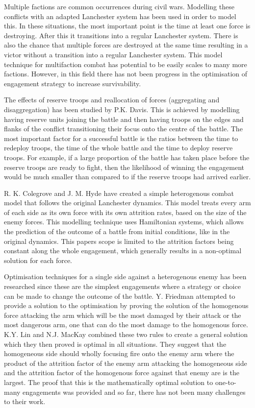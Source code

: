 Multiple factions are common occurrences during civil wars. Modelling these conflicts with an adapted Lanchester system has been used in order to model this. In these situations, the most important point is the time at least one force is destroying. \cite{Kress2018}
 After this it transitions into a regular Lanchester system. There is also the chance that multiple forces are destroyed at the same time resulting in a victor without a transition into a regular Lanchester system. This model technique for multifaction combat has potential to be easily scales to many more factions. However, in this field there has not been progress in the optimisation of engagement strategy to increase survivability. 

The effects of reserve troops and reallocation of forces (aggregating and disaggregation) has been studied by P.K. Davis. \cite{Davis1995} This is achieved by modelling having reserve units joining the battle and then having troops on the edges and flanks of the conflict transitioning their focus onto the centre of the battle. The most important factor for a successful battle is the ratios between the time to redeploy troops, the time of the whole battle and the time to deploy reserve troops. For example, if a large proportion of the battle has taken place before the reserve troops are ready to fight, then the likelihood of winning the engagement would be much smaller than compared to if the reserve troops had arrived earlier.

R. K. Colegrove and J. M. Hyde have created a simple heterogenous combat model that follows the original Lanchester dynamics. This model treats every arm of each side as its own force with its own attrition rates, based on the size of the enemy forces. This modelling technique uses Hamiltonian systems, which allows the prediction of the outcome of a battle from initial conditions, like in the original dynamics. This papers scope is limited to the attrition factors being constant along the whole engagement, which generally results in a non-optimal solution for each force.\cite{Colegrave1993}

Optimisation techniques for a single side against a heterogenous enemy has been researched since these are the simplest engagements where a strategy or choice can be made to change the outcome of the battle. Y. Friedman attempted to provide a solution to the optimisation by proving the solution of the homogenous force attacking the arm which will be the most damaged by their attack or the most dangerous arm, one that can do the most damage to the homogenous force. K.Y. Lin and N.J. MacKay combined these two rules to create a general solution which they then proved is optimal in all situations. They suggest that the homogeneous side should wholly focusing fire onto the enemy arm where the product of the attrition factor of the enemy arm attacking the homogeneous side and the attrition factor of the homogenous force against that enemy are is the largest. The proof that this is the mathematically optimal solution to one-to-many engagements was provided and so far, there has not been many challenges to their work.

